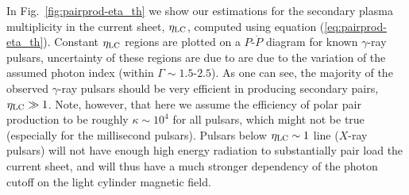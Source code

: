 \begin{figure}[htb]
\end{figure}

In Fig.~\ref{fig:pairprod-eta_th} we show our estimations for the secondary plasma multiplicity in the current sheet, $\eta_{\rm LC}$, computed using equation (\ref{eq:pairprod-eta_th}). Constant $\eta_{\rm LC}$ regions are plotted on a $P$-$\dot{P}$ diagram for known $\gamma$-ray pulsars, uncertainty of these regions are due to are due to the variation of the assumed photon index (within $\Gamma\sim 1.5\text{-}2.5$). As one can see, the majority of the observed $\gamma$-ray pulsars should be very efficient in producing secondary pairs, $\eta_{\rm LC}\gg 1$. Note, however, that here we assume the efficiency of polar pair production to be roughly $\kappa\sim 10^4$ for all pulsars, which might not be true (especially for the millisecond pulsars). Pulsars below $\eta_{\rm LC}\sim 1$ line ($X$-ray pulsars) will not have enough high energy radiation to substantially pair load the current sheet, and will thus have a much stronger dependency of the photon cutoff on the light cylinder magnetic field.


